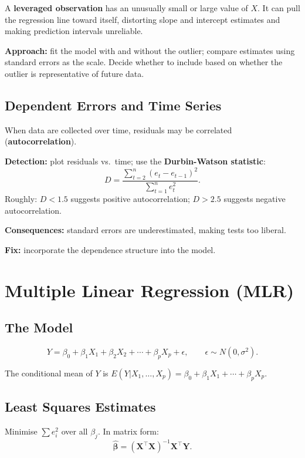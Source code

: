 \documentclass[12pt, a4paper]{article}
\begin{document}
A \textbf{leveraged observation} has an unusually small or large value of $X$. It can pull the regression line toward itself, distorting slope and intercept estimates and making prediction intervals unreliable.

\textbf{Approach:} fit the model with and without the outlier; compare estimates using standard errors as the scale. Decide whether to include based on whether the outlier is representative of future data.

\subsection{Dependent Errors and Time Series}

When data are collected over time, residuals may be correlated (\textbf{autocorrelation}).

\textbf{Detection:} plot residuals vs.\ time; use the \textbf{Durbin-Watson statistic}:
\[
  D = \frac{\sum_{t=2}^n (e_t - e_{t-1})^2}{\sum_{t=1}^n e_t^2}.
\]
Roughly: $D < 1.5$ suggests positive autocorrelation; $D > 2.5$ suggests negative autocorrelation.

\textbf{Consequences:} standard errors are underestimated, making tests too liberal.

\textbf{Fix:} incorporate the dependence structure into the model.

\section{Multiple Linear Regression (MLR)}

\subsection{The Model}

\[
  Y = \beta_0 + \beta_1 X_1 + \beta_2 X_2 + \cdots + \beta_p X_p + \epsilon,
  \qquad \epsilon \sim N(0,\sigma^2).
\]

The conditional mean of $Y$ is $E(Y|X_1,\ldots,X_p) = \beta_0 + \beta_1 X_1 + \cdots + \beta_p X_p$.

\subsection{Least Squares Estimates}

Minimise $\sum e_i^2$ over all $\beta_j$. In matrix form:
\[
  \hat{\boldsymbol{\beta}} = (\mathbf{X}^\top\mathbf{X})^{-1}\mathbf{X}^\top\mathbf{Y}.
\]
\end{document}
